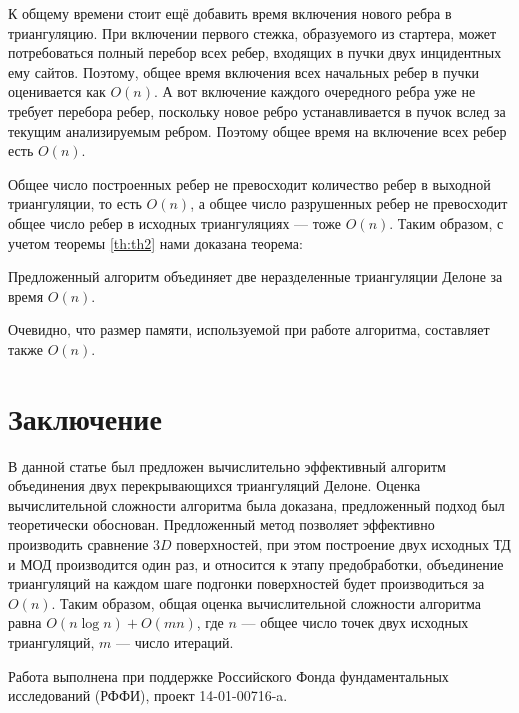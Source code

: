 \documentclass[12pt]{article}
\begin{document}
К общему времени стоит ещё добавить время включения нового ребра в триангуляцию.
При включении первого стежка, образуемого из стартера, может потребоваться полный перебор всех ребер, входящих в пучки двух инцидентных ему сайтов. Поэтому, общее время включения всех начальных ребер в пучки оценивается как $O(n)$.
А вот включение каждого очередного ребра уже не требует перебора ребер,
поскольку новое ребро устанавливается в пучок вслед за текущим анализируемым ребром.
Поэтому общее время на включение всех ребер есть $O(n)$.

Общее число построенных ребер не превосходит количество ребер в выходной триангуляции, то есть $O(n)$,
а общее число разрушенных ребер не превосходит общее число ребер в исходных триангуляциях --- тоже $O(n)$.
Таким образом, с учетом теоремы \ref{th:th2} нами доказана теорема:

\begin{theorem}
\label{th:th3}
Предложенный алгоритм объединяет две неразделенные триангуляции Делоне за время $O(n)$.
\end{theorem}

Очевидно, что размер памяти, используемой при работе алгоритма, составляет также   $O(n)$.

\section{Заключение}
В данной статье был предложен вычислительно эффективный алгоритм объединения двух перекрывающихся триангуляций Делоне.
Оценка вычислительной сложности алгоритма была доказана, предложенный подход был теоретически обоснован.
Предложенный метод позволяет эффективно производить сравнение $3D$ поверхностей, при этом построение двух исходных ТД и МОД производится один раз, и относится к этапу предобработки, объединение триангуляций на каждом шаге подгонки поверхностей будет производиться за $O(n)$.
Таким образом, общая оценка вычислительной сложности алгоритма равна $O(n\log n) + O(mn)$, где $n$ --- общее число точек двух исходных триангуляций, $m$ --- число итераций.

Работа выполнена при поддержке Российского Фонда фундаментальных исследований (РФФИ), проект 14-01-00716-a.

\newpage

{}
\end{document}
